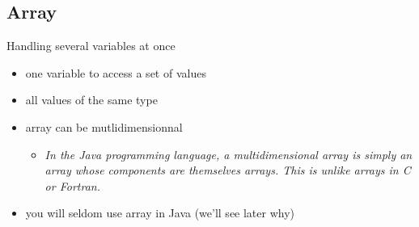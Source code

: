 {  \subsection{Array}
   \begin{frame}
    \begin{block}{Handling several variables at once}
      \begin{itemize}
        \item one variable to access a set of values
        \item all values of the same type
        \item array can be mutlidimensionnal
        \begin{itemize}
          \item \textit{In the Java programming language, a multidimensional array is simply an array
                        whose components are themselves arrays. This is unlike arrays in C or Fortran.}
        \end{itemize}
        \item you will seldom use array in Java (we'll see later why)
      \end{itemize}
    \end{block}
   \end{frame}



}
